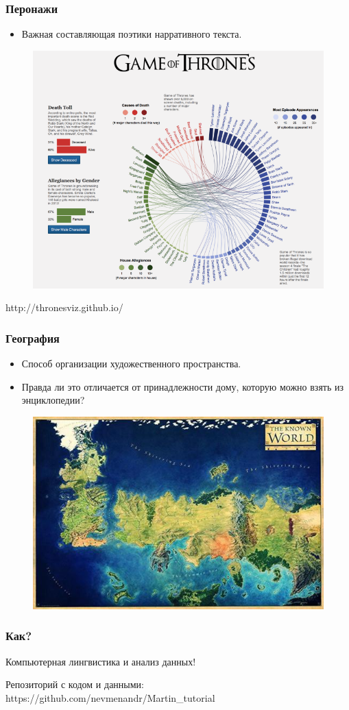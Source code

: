 \documentclass{beamer}
\begin{document}
\begin{frame}
\frametitle{Перонажи}

\begin{itemize}
\item Важная составляющая поэтики нарративного текста.
\end{itemize} 

\begin{figure}
\includegraphics[width=0.5\linewidth]{got_heroes}
\end{figure}
http://thronesviz.github.io/
\end{frame}

\begin{frame}
\frametitle{География}

\begin{itemize}
\item Способ организации художественного пространства.
\item Правда ли это отличается от принадлежности дому, которую можно взять из энциклопедии?
\end{itemize} 

\begin{figure}
\includegraphics[width=0.5\linewidth]{Map}
\end{figure}
\end{frame}



\begin{frame}
\frametitle{Как?}

\begin{center}
	{\LARGE Компьютерная лингвистика и анализ данных!}
\end{center}

Репозиторий с кодом и данными: https://github.com/nevmenandr/Martin\_tutorial

\end{frame}
\end{document}
